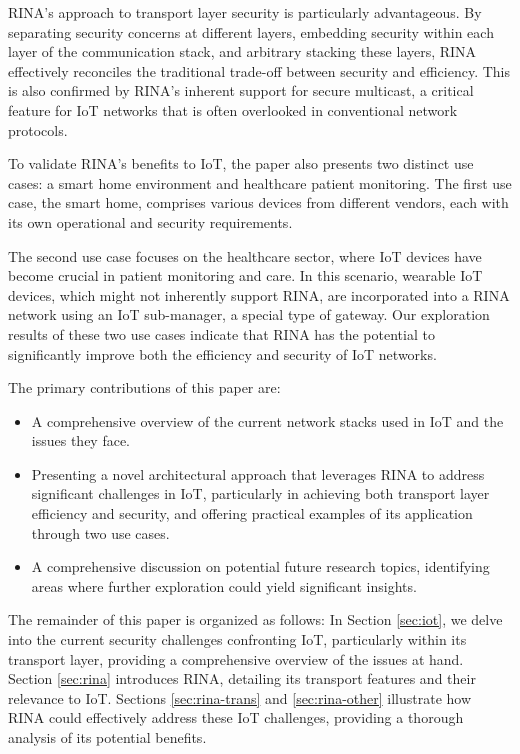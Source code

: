 \documentclass{ieeeaccess}
\begin{document}
RINA's approach to transport layer security is particularly advantageous. By separating security concerns at different layers, embedding security within each layer of the communication stack, and arbitrary stacking these layers, RINA effectively reconciles the traditional trade-off between security and efficiency. This is also confirmed by RINA's inherent support for secure multicast, a critical feature for IoT networks that is often overlooked in conventional network protocols.

To validate RINA's benefits to IoT, the paper also presents two distinct use cases: a smart home environment and healthcare patient monitoring. The first use case, the smart home, comprises various devices from different vendors, each with its own operational and security requirements. 

The second use case focuses on the healthcare sector, where IoT devices have become crucial in patient monitoring and care. In this scenario, wearable IoT devices, which might not inherently support RINA, are incorporated into a RINA network using an IoT sub-manager, a special type of gateway. Our exploration results of these two use cases indicate that RINA has the potential to significantly improve both the efficiency and security of IoT networks.

The primary contributions of this paper are:
\begin{itemize}
	\item A comprehensive overview of the current network stacks used in IoT and the issues they face.
	\item Presenting a novel architectural approach that leverages RINA to address significant challenges in IoT, particularly in achieving both transport layer efficiency and security, and offering practical examples of its application through two use cases.
	\item A comprehensive discussion on potential future research topics, identifying areas where further exploration could yield significant insights.
\end{itemize}




The remainder of this paper is organized as follows: 
In Section \ref{sec:iot}, we delve into the current security challenges confronting IoT, particularly within its transport layer, providing a comprehensive overview of the issues at hand. Section \ref{sec:rina} introduces RINA, detailing its transport features and their relevance to IoT. Sections \ref{sec:rina-trans} and \ref{sec:rina-other} illustrate how RINA could effectively address these IoT challenges, providing a thorough analysis of its potential benefits. 
\end{document}
